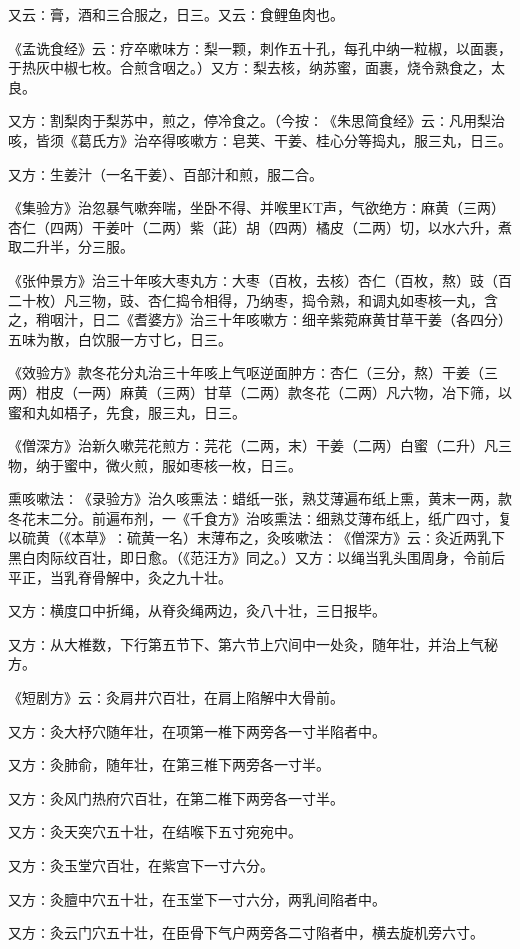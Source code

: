 \documentclass[a4paper,12pt,UTF8,twoside]{ctexbook}
\begin{document}
又云∶膏，酒和三合服之，日三。又云∶食鲤鱼肉也。

《孟诜食经》云∶疗卒嗽味方∶梨一颗，刺作五十孔，每孔中纳一粒椒，以面裹，于热灰中椒七枚。合煎含咽之。）又方∶梨去核，纳苏蜜，面裹，烧令熟食之，太良。

又方∶割梨肉于梨苏中，煎之，停冷食之。（今按∶《朱思简食经》云∶凡用梨治咳，皆须《葛氏方》治卒得咳嗽方∶皂荚、干姜、桂心分等捣丸，服三丸，日三。

又方∶生姜汁（一名干姜）、百部汁和煎，服二合。

《集验方》治忽暴气嗽奔喘，坐卧不得、并喉里KT声，气欲绝方∶麻黄（三两）杏仁（四两）干姜叶（二两）紫（茈）胡（四两）橘皮（二两）切，以水六升，煮取二升半，分三服。

《张仲景方》治三十年咳大枣丸方∶大枣（百枚，去核）杏仁（百枚，熬）豉（百二十枚）凡三物，豉、杏仁捣令相得，乃纳枣，捣令熟，和调丸如枣核一丸，含之，稍咽汁，日二《耆婆方》治三十年咳嗽方∶细辛紫菀麻黄甘草干姜（各四分）五味为散，白饮服一方寸匕，日三。

《效验方》款冬花分丸治三十年咳上气呕逆面肿方∶杏仁（三分，熬）干姜（三两）柑皮（一两）麻黄（三两）甘草（二两）款冬花（二两）凡六物，冶下筛，以蜜和丸如梧子，先食，服三丸，日三。

《僧深方》治新久嗽芫花煎方∶芫花（二两，末）干姜（二两）白蜜（二升）凡三物，纳于蜜中，微火煎，服如枣核一枚，日三。

熏咳嗽法∶《录验方》治久咳熏法∶蜡纸一张，熟艾薄遍布纸上熏，黄末一两，款冬花末二分。前遍布剂，一《千食方》治咳熏法∶细熟艾薄布纸上，纸广四寸，复以硫黄（《本草》∶硫黄一名）末薄布之，灸咳嗽法∶《僧深方》云∶灸近两乳下黑白肉际纹百壮，即日愈。（《范汪方》同之。）又方∶以绳当乳头围周身，令前后平正，当乳脊骨解中，灸之九十壮。

又方∶横度口中折绳，从脊灸绳两边，灸八十壮，三日报毕。

又方∶从大椎数，下行第五节下、第六节上穴间中一处灸，随年壮，并治上气秘方。

《短剧方》云∶灸肩井穴百壮，在肩上陷解中大骨前。

又方∶灸大杼穴随年壮，在项第一椎下两旁各一寸半陷者中。

又方∶灸肺俞，随年壮，在第三椎下两旁各一寸半。

又方∶灸风门热府穴百壮，在第二椎下两旁各一寸半。

又方∶灸天突穴五十壮，在结喉下五寸宛宛中。

又方∶灸玉堂穴百壮，在紫宫下一寸六分。

又方∶灸膻中穴五十壮，在玉堂下一寸六分，两乳间陷者中。

又方∶灸云门穴五十壮，在臣骨下气户两旁各二寸陷者中，横去旋机旁六寸。
\end{document}
